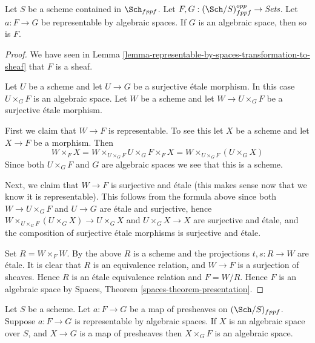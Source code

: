 \begin{lemma}
\label{lemma-representable-by-spaces-over-space}
Let $S$ be a scheme contained in $\Sch_{fppf}$.
Let $F, G : (\Sch/S)_{fppf}^{opp} \to \textit{Sets}$.
Let $a : F \to G$ be representable by algebraic spaces.
If $G$ is an algebraic space, then so is $F$.
\end{lemma}

\begin{proof}
We have seen in
Lemma \ref{lemma-representable-by-spaces-transformation-to-sheaf}
that $F$ is a sheaf.

\medskip\noindent
Let $U$ be a scheme and let $U \to G$ be a surjective \'etale morphism.
In this case $U \times_G F$ is an algebraic space. Let $W$ be a scheme
and let $W \to U \times_G F$ be a surjective \'etale morphism.

\medskip\noindent
First we claim that $W \to F$ is representable.
To see this let $X$ be a scheme and let $X \to F$ be a morphism.
Then
$$
W \times_F X = W \times_{U \times_G F} U \times_G F \times_F X
= W \times_{U \times_G F} (U \times_G X)
$$
Since both $U \times_G F$ and $G$ are algebraic spaces we see that
this is a scheme.

\medskip\noindent
Next, we claim that $W \to F$ is surjective and \'etale (this makes
sense now that we know it is representable). This follows from the
formula above since both $W \to U \times_G F$ and $U \to G$
are \'etale and surjective, hence
$W \times_{U \times_G F} (U \times_G X) \to U \times_G X$ and
$U \times_G X \to X$ are surjective and \'etale, and the composition of
surjective \'etale morphisms is surjective and \'etale.

\medskip\noindent
Set $R = W \times_F W$. By the above $R$ is a scheme and
the projections $t, s : R \to W$
are \'etale. It is clear that $R$ is an equivalence relation, and
$W \to F$ is a surjection of sheaves. Hence $R$ is an \'etale equivalence
relation and $F = W/R$. Hence $F$ is an algebraic space by
Spaces,
Theorem \ref{spaces-theorem-presentation}.
\end{proof}

\begin{lemma}
\label{lemma-representable-by-spaces}
Let $S$ be a scheme.
Let $a : F \to G$ be a map of presheaves on $(\Sch/S)_{fppf}$.
Suppose $a : F \to G$ is representable by algebraic spaces.
If $X$ is an algebraic space over $S$, and $X \to G$ is a map of presheaves
then $X \times_G F$ is an algebraic space.
\end{lemma}

